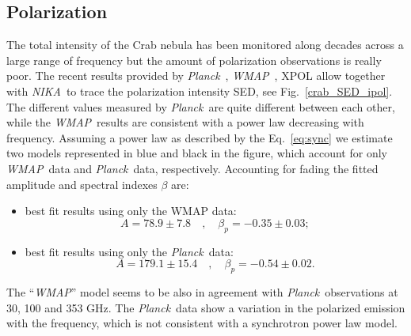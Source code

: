 \documentclass[twocolumn,traditabstract]{aa}
\def\NIKA{\textit{NIKA}}
\def\Planck{\textit{Planck}}
\def\WMAP{\textit{WMAP}}
\begin{document}
\subsection{Polarization}
The total intensity of the Crab nebula has been monitored along decades across a large range of frequency but the amount of polarization observations is really poor.
The recent results provided by \Planck\ \citep{2015arXiv150702058P}, \WMAP\ \citep{2011ApJS..192...19W}, XPOL \citep{aumont2010} allow together with \NIKA\ to trace the polarization intensity SED, see Fig.~\ref{crab_SED_ipol}. The different values measured by \Planck\ are quite different between each other, while the \WMAP\ results are consistent with a power law decreasing with frequency. 
Assuming a power law as described by the Eq.~\ref{eq:sync} we estimate two models represented in blue and black in the figure, which account for only \WMAP\ data and \Planck\ data, respectively.
Accounting for fading the fitted amplitude and spectral indexes $\beta$ are:
\begin{itemize}
\item best fit results using only the WMAP data:
\begin{equation}
A = 78.9\pm7.8 \quad , \quad \beta_p = -0.35\pm0.03;
\end{equation}
\item best fit results using only the \Planck\ data:
\begin{equation}
A = 179.1\pm15.4 \quad , \quad \beta_p = -0.54\pm0.02.
\end{equation}
\end{itemize}

The ``\WMAP'' model seems to be also in agreement with \Planck\ observations at 30, 100 and 353 GHz. 
The \Planck\ data show a variation in the polarized emission with the frequency, which is not consistent with a synchrotron power law model. 
\end{document}

